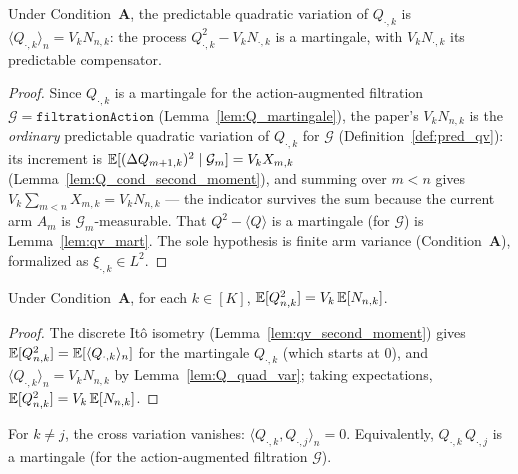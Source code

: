 \begin{lemma}\label{lem:Q_quad_var}
\leanok
{}
Under Condition~\textbf{A}, the predictable quadratic variation of $Q_{\cdot,k}$ is
$\langle Q_{\cdot,k}\rangle_n = V_k N_{n,k}$: the process $Q_{\cdot,k}^2 - V_k N_{\cdot,k}$ is a
martingale, with $V_k N_{\cdot,k}$ its predictable compensator.
\end{lemma}

\begin{proof}\leanok
{}
Since $Q_{\cdot,k}$ is a martingale for the action-augmented filtration
$\mathcal{G} = \texttt{filtrationAction}$ (Lemma~\ref{lem:Q_martingale}), the paper's
$V_k N_{n,k}$ is the \emph{ordinary} predictable quadratic variation of $Q_{\cdot,k}$ for
$\mathcal{G}$ (Definition~\ref{def:pred_qv}): its increment is
$\mathbb{E}[(\Delta Q_{m+1,k})^2\mid\mathcal{G}_m] = V_k X_{m,k}$
(Lemma~\ref{lem:Q_cond_second_moment}), and summing over $m<n$ gives
$V_k\sum_{m<n} X_{m,k} = V_k N_{n,k}$ --- the indicator survives the sum because the current
arm $A_m$ is $\mathcal{G}_m$-measurable. That $Q^2-\langle Q\rangle$ is a martingale (for
$\mathcal{G}$) is Lemma~\ref{lem:qv_mart}. The sole hypothesis is finite arm variance
(Condition~\textbf{A}), formalized as $\xi_{\cdot,k}\in L^2$.
\end{proof}

\begin{lemma}\label{lem:Q_second_moment}
\leanok
{}
Under Condition~\textbf{A}, for each $k \in [K]$,
$\mathbb{E}[Q_{n,k}^2] = V_k\,\mathbb{E}[N_{n,k}]$.
\end{lemma}

\begin{proof}\leanok
{}
The discrete Itô isometry (Lemma~\ref{lem:qv_second_moment}) gives
$\mathbb{E}[Q_{n,k}^2] = \mathbb{E}[\langle Q_{\cdot,k}\rangle_n]$ for the martingale $Q_{\cdot,k}$ (which starts at
$0$), and $\langle Q_{\cdot,k}\rangle_n = V_k N_{n,k}$ by Lemma~\ref{lem:Q_quad_var}; taking
expectations, $\mathbb{E}[Q_{n,k}^2] = V_k\,\mathbb{E}[N_{n,k}]$.
\end{proof}

\begin{lemma}\label{lem:Q_cross_var}
\leanok
{}
For $k \ne j$, the cross variation vanishes: $\langle Q_{\cdot,k}, Q_{\cdot,j}\rangle_n = 0$.
Equivalently, $Q_{\cdot,k}\,Q_{\cdot,j}$ is a martingale (for the action-augmented filtration
$\mathcal{G}$).
\end{lemma}

